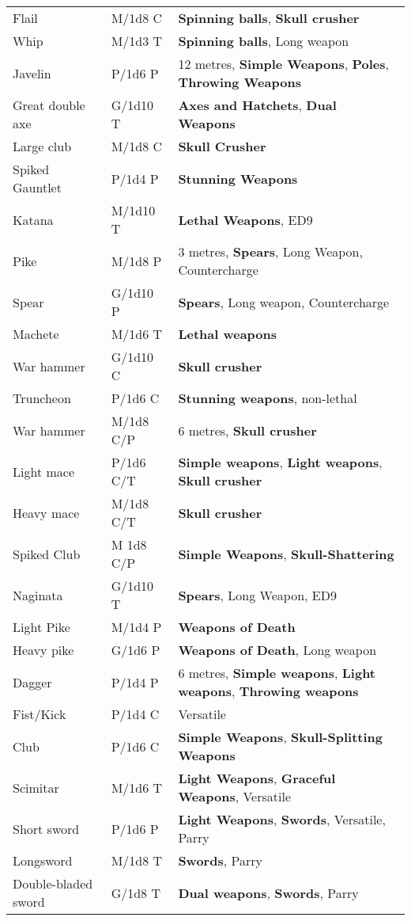 \documentclass[landscape,10pt,a4paper]{article}
\begin{document}
\begin{multicols}{2}
\begin{dmbox}[title=Weapons - page \pageref{equipmentweapons}]
{\begin{tabularx}{1\linewidth}{lll}
Flail& M/1d8 C& \textbf{Spinning balls}, \textbf{Skull crusher}\\
Whip& M/1d3 T& \textbf{Spinning balls}, Long weapon\\
Javelin& P/1d6 P& 12 metres, \textbf{Simple Weapons}, \textbf{Poles}, \textbf{Throwing Weapons}\\
Great double axe& G/1d10 T& \textbf{Axes and Hatchets}, \textbf{Dual Weapons}\\
Large club& M/1d8 C&\textbf{Skull Crusher}\\
Spiked Gauntlet& P/1d4 P&\textbf{Stunning Weapons}\\
Katana& M/1d10 T& \textbf{Lethal Weapons}, ED9\\
Pike& M/1d8 P&3 metres, \textbf{Spears}, Long Weapon, Countercharge\\
Spear& G/1d10 P&\textbf{Spears}, Long weapon, Countercharge\\
Machete& M/1d6 T&\textbf{Lethal weapons}\\
War hammer& G/1d10 C& \textbf{Skull crusher}\\
Truncheon& P/1d6 C& \textbf{Stunning weapons}, non-lethal\\
War hammer& M/1d8 C/P& 6 metres, \textbf{Skull crusher}\\
Light mace& P/1d6 C/T& \textbf{Simple weapons}, \textbf{Light weapons}, \textbf{Skull crusher} \\
Heavy mace& M/1d8 C/T& \textbf{Skull crusher}\\ 
Spiked Club& M 1d8 C/P& \textbf{Simple Weapons}, \textbf{Skull-Shattering}\\
Naginata& G/1d10 T&\textbf{Spears}, Long Weapon, ED9\\
Light Pike& M/1d4 P&\textbf{Weapons of Death}\\
Heavy pike& G/1d6 P&\textbf{Weapons of Death}, Long weapon\\
Dagger& P/1d4 P& 6 metres, \textbf{Simple weapons}, \textbf{Light weapons}, \textbf{Throwing weapons}\\
Fist/Kick & P/1d4 C&Versatile\\
Club& P/1d6 C& \textbf{Simple Weapons}, \textbf{Skull-Splitting Weapons}\\
Scimitar& M/1d6 T&\textbf{Light Weapons}, \textbf{Graceful Weapons}, Versatile\\
Short sword& P/1d6 P&\textbf{Light Weapons}, \textbf{Swords}, Versatile, Parry\\
Longsword& M/1d8 T&\textbf{Swords}, Parry\\
Double-bladed sword& G/1d8 T& \textbf{Dual weapons}, \textbf{Swords}, Parry\\

\end{tabularx}}
\end{dmbox}
\end{multicols}
\end{document}
